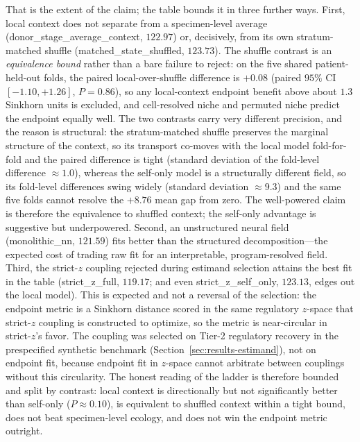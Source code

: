 That is the extent of the claim; the table bounds it in three further ways. First, local context does not separate from a specimen-level average (donor\_stage\_average\_context, $122.97$) or, decisively, from its own stratum-matched shuffle (matched\_state\_shuffled, $123.73$). The shuffle contrast is an \emph{equivalence bound} rather than a bare failure to reject: on the five shared patient-held-out folds, the paired local-over-shuffle difference is $+0.08$ (paired $95\%$ CI $[-1.10, +1.26]$, $P = 0.86$), so any local-context endpoint benefit above about $1.3$ Sinkhorn units is excluded, and cell-resolved niche and permuted niche predict the endpoint equally well. The two contrasts carry very different precision, and the reason is structural: the stratum-matched shuffle preserves the marginal structure of the context, so its transport co-moves with the local model fold-for-fold and the paired difference is tight (standard deviation of the fold-level difference $\approx 1.0$), whereas the self-only model is a structurally different field, so its fold-level differences swing widely (standard deviation $\approx 9.3$) and the same five folds cannot resolve the $+8.76$ mean gap from zero. The well-powered claim is therefore the equivalence to shuffled context; the self-only advantage is suggestive but underpowered. Second, an unstructured neural field (monolithic\_nn, $121.59$) fits better than the structured decomposition---the expected cost of trading raw fit for an interpretable, program-resolved field. Third, the strict-$z$ coupling rejected during estimand selection attains the best fit in the table (strict\_z\_full, $119.17$; and even strict\_z\_self\_only, $123.13$, edges out the local model). This is expected and not a reversal of the selection: the endpoint metric is a Sinkhorn distance scored in the same regulatory $z$-space that strict-$z$ coupling is constructed to optimize, so the metric is near-circular in strict-$z$'s favor. The coupling was selected on Tier-2 regulatory recovery in the prespecified synthetic benchmark (Section~\ref{sec:results-estimand}), not on endpoint fit, because endpoint fit in $z$-space cannot arbitrate between couplings without this circularity. The honest reading of the ladder is therefore bounded and split by contrast: local context is directionally but not significantly better than self-only ($P \approx 0.10$), is equivalent to shuffled context within a tight bound, does not beat specimen-level ecology, and does not win the endpoint metric outright.

